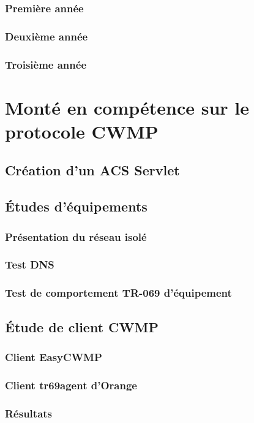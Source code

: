 \documentclass[12pt,a4paper]{report}
\begin{document}
\subsubsection{Première année}
\subsubsection{Deuxième année}
\subsubsection{Troisième année}

\newpage
\section{Monté en compétence sur le protocole CWMP}
\subsection{Création d'un ACS Servlet}
\subsection{Études d'équipements}
\subsubsection{Présentation du réseau isolé}
\subsubsection{Test DNS}
\subsubsection{Test de comportement TR-069 d'équipement}
\subsection{Étude de client CWMP}
\subsubsection{Client EasyCWMP}
\subsubsection{Client tr69agent d'Orange}
\subsubsection{Résultats} %
\end{document}
